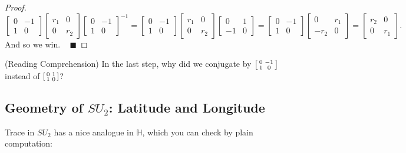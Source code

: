 \begin{proof}
    \[ \begin{bmatrix} 0 & -1 \\ 1 & 0 \end{bmatrix} \begin{bmatrix} r_1 & 0 \\ 0 & r_2 \end{bmatrix} \begin{bmatrix} 0 & -1 \\ 1 & 0 \end{bmatrix}^{-1} = \begin{bmatrix} 0 & -1 \\ 1 & 0 \end{bmatrix} \begin{bmatrix} r_1 & 0 \\ 0 & r_2 \end{bmatrix} \begin{bmatrix} 0 & 1 \\ -1 & 0 \end{bmatrix} = \begin{bmatrix} 0 & -1 \\ 1 & 0 \end{bmatrix} \begin{bmatrix} 0 & r_1 \\ -r_2 & 0 \end{bmatrix} = \begin{bmatrix} r_2 & 0 \\ 0 & r_1 \end{bmatrix}. \]
    And so we win. ~ $\blacksquare$
\end{proof}

\begin{remark}
    (Reading Comprehension) In the last step, why did we conjugate by $\begin{bsmallmatrix} 0 & -1 \\ 1 & 0 \end{bsmallmatrix}$ instead of $\begin{bsmallmatrix} 0 & 1 \\ 1 & 0 \end{bsmallmatrix}$?
\end{remark}

\subsection{Geometry of $SU_2$: Latitude and Longitude}
    
Trace in $SU_2$ has a nice analogue in $\mathbb{H}$, which you can check by plain computation:

